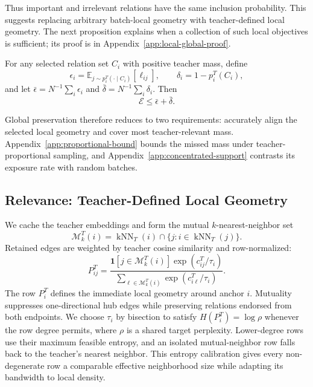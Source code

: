 Thus important and irrelevant relations have the same inclusion probability. This suggests replacing arbitrary batch-local geometry with teacher-defined local geometry. The next proposition explains when a collection of such local objectives is sufficient; its proof is in Appendix~\ref{app:local-global-proof}.

\begin{proposition}
\label{prop:global-geometry}
For any selected relation set $C_i$ with positive teacher mass, define
\begin{equation}
\epsilon_i
=\mathbb E_{j\sim p_i^T(\cdot\mid C_i)}[\ell_{ij}],
\qquad
\delta_i=1-p_i^T(C_i),
\end{equation}
and let $\bar\epsilon=N^{-1}\sum_i\epsilon_i$ and $\bar\delta=N^{-1}\sum_i\delta_i$. Then
\begin{equation}
\mathcal E\leq\bar\epsilon+\bar\delta.
\label{eq:global-geometry-bound}
\end{equation}
\end{proposition}

Global preservation therefore reduces to two requirements: accurately align the selected local geometry and cover most teacher-relevant mass. Appendix~\ref{app:proportional-bound} bounds the missed mass under teacher-proportional sampling, and Appendix~\ref{app:concentrated-support} contrasts its exposure rate with random batches.

\subsection{Relevance: Teacher-Defined Local Geometry}
\label{sec:graph}

We cache the teacher embeddings and form the mutual $k$-nearest-neighbor set
\begin{equation}
\mathcal M_k^T(i)
=\operatorname{kNN}_T(i)
\cap\{j:i\in\operatorname{kNN}_T(j)\}.
\end{equation}
Retained edges are weighted by teacher cosine similarity and row-normalized:
\begin{equation}
P^T_{ij}
=\frac{\mathbf 1[j\in\mathcal M_k^T(i)]\exp(c^T_{ij}/\tau_i)}
{\sum_{\ell\in\mathcal M_k^T(i)}\exp(c^T_{i\ell}/\tau_i)}.
\label{eq:teacher-transition}
\end{equation}
The row $P_i^T$ defines the immediate local geometry around anchor $i$. Mutuality suppresses one-directional hub edges while preserving relations endorsed from both endpoints. We choose $\tau_i$ by bisection to satisfy $H(P_i^T)=\log\rho$ whenever the row degree permits, where $\rho$ is a shared target perplexity. Lower-degree rows use their maximum feasible entropy, and an isolated mutual-neighbor row falls back to the teacher's nearest neighbor. This entropy calibration gives every non-degenerate row a comparable effective neighborhood size while adapting its bandwidth to local density.

